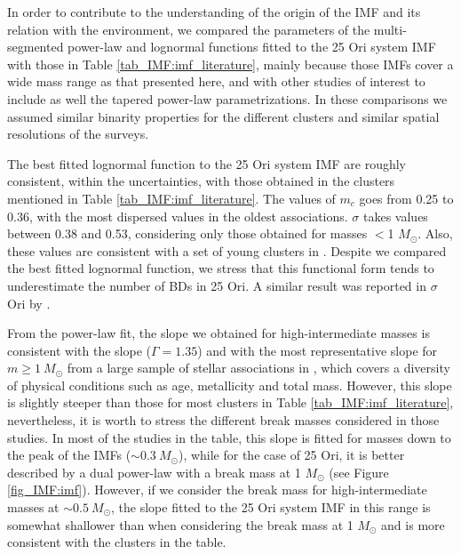 \documentclass[12pt]{article}
\begin{document}
In order to contribute to the understanding of the origin of the IMF and its relation with the environment, we compared the parameters of the multi-segmented power-law and lognormal functions fitted to the 25 Ori system IMF with those in Table \ref{tab_IMF:imf_literature}, mainly because those IMFs cover a wide mass range as that presented here, and with other studies of interest to include as well the tapered power-law parametrizations. In these comparisons we assumed similar binarity properties for the different clusters and similar spatial resolutions of the surveys.

The best fitted lognormal function to the 25 Ori system IMF are roughly consistent, within the uncertainties, with those obtained in the clusters mentioned in Table \ref{tab_IMF:imf_literature}. The values of $m_c$ goes from 0.25 to 0.36, with the most dispersed values in the oldest associations. $\sigma$ takes values between 0.38 and 0.53, considering only those obtained for masses $<$1 $M_\odot$. Also, these values are consistent with a set of young clusters in \citet{Bayo2011}. Despite we compared the best fitted lognormal function, we stress that this functional form tends to underestimate the number of BDs in 25 Ori. A similar result was reported in $\sigma$ Ori by \citet{PenaRamirez2012}. 

From the power-law fit, the slope we obtained for high-intermediate masses is consistent with the \citet{Salpeter1955} slope ($\Gamma=1.35$) and with the most representative slope for $m\ge1\ M_\odot$ from a large sample of stellar associations in \citet{Bastian2010}, which covers a diversity of physical conditions such as age, metallicity and total mass. However, this slope is slightly steeper than those for most clusters in Table \ref{tab_IMF:imf_literature}, nevertheless, it is worth to stress the different break masses considered in those studies. In most of the studies in the table, this slope is fitted for masses down to the peak of the IMFs ($\sim0.3\ M_\odot$), while for the case of 25 Ori, it is better described by a dual power-law with a break mass at 1 $M_\odot$ (see Figure \ref{fig_IMF:imf}). However, if we consider the break mass for high-intermediate masses at $\sim0.5\ M_\odot$, the slope fitted to the 25 Ori system IMF in this range is somewhat shallower than when considering the break mass at 1 $M_\odot$ and is more consistent with the clusters in the table.
\end{document}
